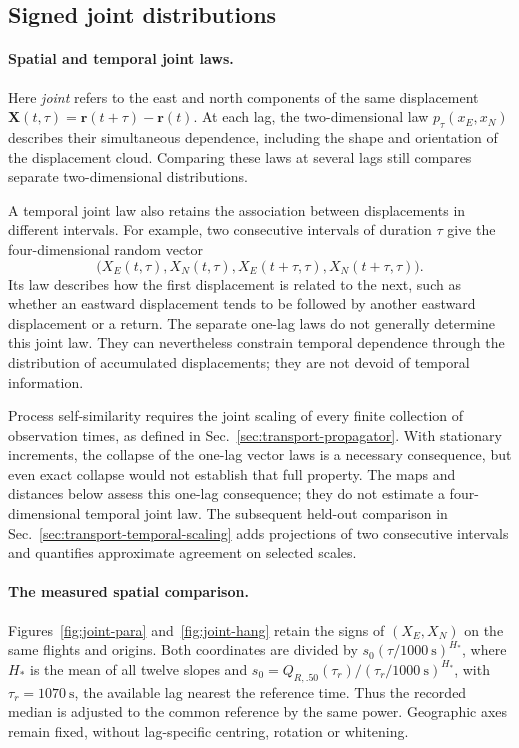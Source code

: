 \subsection{Signed joint distributions}
\paragraph{Spatial and temporal joint laws.}
Here \emph{joint} refers to the east and north components of the same displacement
$\mathbf X(t,\tau)=\mathbf r(t+\tau)-\mathbf r(t)$. At each lag, the
two-dimensional law $p_\tau(x_E,x_N)$ describes their simultaneous dependence,
including the shape and orientation of the displacement cloud. Comparing these
laws at several lags still compares separate two-dimensional distributions.

A temporal joint law also retains the association between displacements in
different intervals. For example, two consecutive intervals of duration $\tau$
give the four-dimensional random vector
\[
 \bigl(X_E(t,\tau),X_N(t,\tau),
       X_E(t+\tau,\tau),X_N(t+\tau,\tau)\bigr).
\]
Its law describes how the first displacement is related to the next, such as
whether an eastward displacement tends to be followed by another eastward
displacement or a return. The separate one-lag laws do not generally determine
this joint law. They can nevertheless constrain temporal dependence through
the distribution of accumulated displacements; they are not devoid of temporal
information.

Process self-similarity requires the joint scaling of every finite collection
of observation times, as defined in Sec.~\ref{sec:transport-propagator}.
With stationary increments, the collapse of the one-lag vector laws is a
necessary consequence, but even exact collapse would not establish that full
property. The maps and distances below assess this one-lag consequence; they
do not estimate a four-dimensional temporal joint law. The subsequent held-out
comparison in Sec.~\ref{sec:transport-temporal-scaling} adds projections of two
consecutive intervals and quantifies approximate agreement on selected scales.

\paragraph{The measured spatial comparison.}
Figures~\ref{fig:joint-para} and~\ref{fig:joint-hang} retain the signs of
$(X_E,X_N)$ on the same flights and origins. Both coordinates are divided by
$s_0(\tau/\SI{1000}{\second})^{H_*}$, where $H_*$ is the mean of all twelve slopes
and $s_0=Q_{R,.50}(\tau_r)/(\tau_r/\SI{1000}{\second})^{H_*}$,
with $\tau_r=\SI{1070}{\second}$, the available lag nearest the reference time.
Thus the recorded median is adjusted to the common reference by the same power.
Geographic axes remain fixed,
without lag-specific centring, rotation or whitening.


